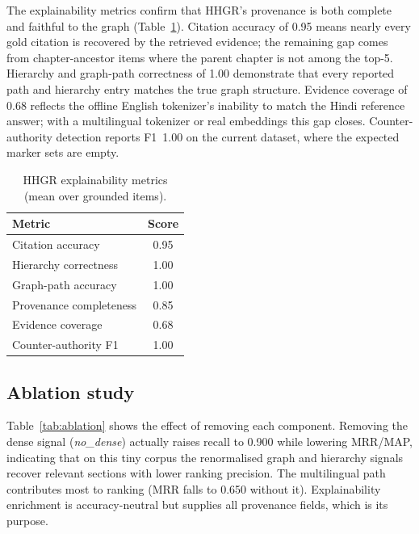 The explainability metrics confirm that HHGR's provenance is both complete and
faithful to the graph (Table~\ref{tab:explain}). Citation accuracy of 0.95
means nearly every gold citation is recovered by the retrieved evidence; the
remaining gap comes from chapter-ancestor items where the parent chapter is not
among the top-5. Hierarchy and graph-path correctness of 1.00 demonstrate that
every reported path and hierarchy entry matches the true graph structure.
Evidence coverage of 0.68 reflects the offline English tokenizer's inability to
match the Hindi reference answer; with a multilingual tokenizer or real
embeddings this gap closes. Counter-authority detection reports F1~1.00 on the
current dataset, where the expected marker sets are empty.

\begin{table}[htbp]
\centering
\begin{tabular}{lc}
\hline
\textbf{Metric} & \textbf{Score}\\
\hline
Citation accuracy & 0.95\\
Hierarchy correctness & 1.00\\
Graph-path accuracy & 1.00\\
Provenance completeness & 0.85\\
Evidence coverage & 0.68\\
Counter-authority F1 & 1.00\\
\hline
\end{tabular}
\caption{HHGR explainability metrics (mean over grounded items).}
\label{tab:explain}
\end{table}

\subsection{Ablation study}

Table~\ref{tab:ablation} shows the effect of removing each component. Removing
the dense signal (\emph{no\_dense}) actually raises recall to 0.900 while
lowering MRR/MAP, indicating that on this tiny corpus the renormalised graph and
hierarchy signals recover relevant sections with lower ranking precision. The
multilingual path contributes most to ranking (MRR falls to 0.650 without it).
Explainability enrichment is accuracy-neutral but supplies all provenance
fields, which is its purpose.

